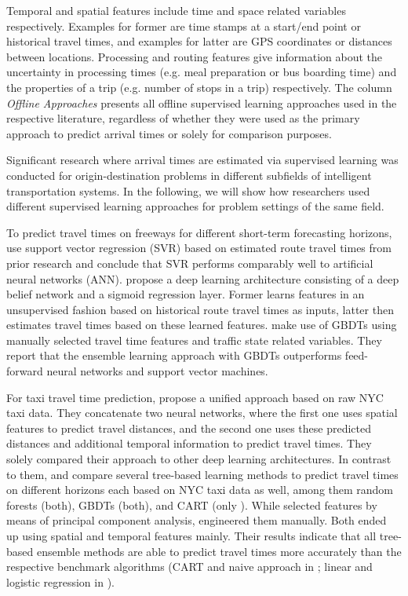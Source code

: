 Temporal and spatial features include time and space related variables respectively. Examples for former are time stamps at a start/end point or historical travel times, and examples for latter are GPS coordinates or distances between locations. Processing and routing features give information about the uncertainty in processing times (e.g. meal preparation or bus boarding time) and the properties of a trip (e.g. number of stops in a trip) respectively.
The column \textit{Offline Approaches} presents all offline supervised learning approaches used in the respective literature, regardless of whether they were used as the primary approach to predict arrival times or solely for comparison purposes.

Significant research where arrival times are estimated via supervised learning was conducted for origin-destination problems in different subfields of intelligent transportation systems. In the following, we will show how researchers used different supervised learning approaches for problem settings of the same field. 

To predict travel times on freeways for different short-term forecasting horizons, \citet{Vanajakshi2007} use support vector regression (SVR) based on estimated route travel times from prior research and conclude that SVR performs comparably well to artificial neural networks (ANN).
\citet{Siripanpornchana2016_AnnWithDbnFS} propose a deep learning architecture consisting of a deep belief network and a sigmoid regression layer. Former learns features in an unsupervised fashion based on historical route travel times as inputs, latter then estimates travel times based on these learned features. \citet{Cheng2019_GBDT} make use of GBDTs using manually selected travel time features and traffic state related variables. They report that the ensemble learning approach with GBDTs outperforms feed-forward
neural networks and support vector machines.

For taxi travel time prediction, \citet{jindal2017unified} propose a unified approach based on raw NYC taxi data. They concatenate two neural networks, where the first one uses spatial features to predict travel distances, and the second one uses these predicted distances and additional temporal information to predict travel times. They solely compared their approach to other deep learning architectures.
In contrast to them, \citet{Huang2018_GBDT} and \citet{huang2020travel_GBDT} compare several tree-based learning methods to predict travel times on different horizons each based on NYC taxi data as well, among them random forests (both), GBDTs (both), and CART (only \citet{huang2020travel_GBDT}). While \citet{Huang2018_GBDT} selected features by means of principal component analysis, \citet{huang2020travel_GBDT} engineered them manually. Both ended up using spatial and temporal features mainly. Their results indicate that all tree-based ensemble methods are able to predict travel times more accurately than the respective benchmark algorithms (CART and naive approach in \citet{huang2020travel_GBDT}; linear and logistic regression in \citet{Huang2018_GBDT}).

